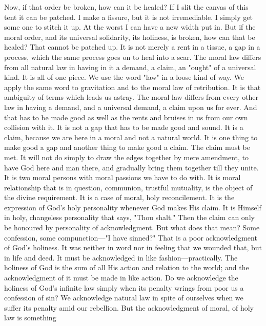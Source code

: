 \documentclass[12pt,a5paper,twoside,titlepage]{book}
\begin{document}
Now, if that order be broken, how can it be 
healed? If I slit the canvas of this tent it can 
be patched. I make a fissure, but it is not irremediable. 
I simply get some one to stitch it up. 
At the worst I can have a new width put in. But 
if the moral order, and its universal solidarity, its 
holiness, is broken, how can that be healed? 
That cannot be patched up. It is not merely a 
rent in a tissue, a gap in a process, which the 
same process goes on to heal into a scar. The 
moral law differs from all natural law in having 
in it a demand, a claim, an "ought" of a 
universal kind. It is all of one piece. We use the 
word "law" in a loose kind of way. We apply 
the same word to gravitation and to the moral 
law of retribution. It is that ambiguity of terms 
which leads us astray. The moral law differs 
from every other law in having a demand, and a 
universal demand, a claim upon us for ever. 
And that has to be made good as well as the 
rents and bruises in us from our own collision 
with it. It is not a gap that has to be made 
good and sound. It is a claim, because we are 
here in a moral and not a natural world. It is 
one thing to make good a gap and another thing 
to make good a claim. The claim must be met. 
It will not do simply to draw the edges together 
by mere amendment, to have God here and man 
there, and gradually bring them together till 
they unite. It is two moral persons with 
moral passions we have to do with. It is moral 
relationship that is in question, communion, 
trustful mutuality, is the object of the divine 
requirement. It is a case of moral, holy reconcilement. 
It is the expression of God's holy 
personality whenever God makes His claim. 
It is Himself in holy, changeless personality 
that says, "Thou shalt." Then the claim can 
only be honoured by personality of acknowledgment. 
But what does that mean? Some 
confession, some compunction---"I have sinned?" 
That is a poor acknowledgment of God's holiness. 
It was neither in word nor in feeling that 
we wounded that, but in life and deed. It must 
be acknowledged in like fashion---practically. 
The holiness of God is the sum of all His action 
and relation to the world; and the acknowledgment 
of it must be made in like action. Do we 
acknowledge the holiness of God's infinite law 
simply when its penalty wrings from poor us a 
confession of sin? We acknowledge natural 
law in spite of ourselves when we suffer its 
penalty amid our rebellion. But the acknowledgment 
of moral, of holy law is something 
\end{document}
